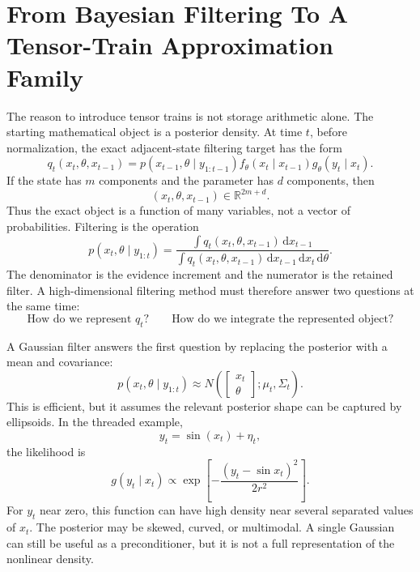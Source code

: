 \documentclass[11pt]{article}
\numberwithin{equation}{section}
\newcommand{\R}{\mathbb R}
\newcommand{\dd}{\,\mathrm d}
\begin{document}
\section{From Bayesian Filtering To A Tensor-Train Approximation Family}

The reason to introduce tensor trains is not storage arithmetic alone.  The
starting mathematical object is a posterior density.  At time \(t\), before
normalization, the exact adjacent-state filtering target has the form
\begin{equation}
    q_t(x_t,\theta,x_{t-1})
    =
    p(x_{t-1},\theta\mid y_{1:t-1})
    f_\theta(x_t\mid x_{t-1})
    g_\theta(y_t\mid x_t).
    \label{eq:p25-bridge-1}
\end{equation}
If the state has \(m\) components and the parameter has \(d\) components, then
\begin{equation}
    (x_t,\theta,x_{t-1})\in\R^{2m+d}.
    \label{eq:p25-bridge-2}
\end{equation}
Thus the exact object is a function of many variables, not a vector of
probabilities.  Filtering is the operation
\begin{equation}
    p(x_t,\theta\mid y_{1:t})
    =
    \frac{\int q_t(x_t,\theta,x_{t-1})\dd x_{t-1}}
    {\int q_t(x_t,\theta,x_{t-1})\dd x_{t-1}\dd x_t\dd\theta}.
    \label{eq:p25-bridge-3}
\end{equation}
The denominator is the evidence increment and the numerator is the retained
filter.  A high-dimensional filtering method must therefore answer two
questions at the same time:
\begin{equation}
    \text{How do we represent }q_t?
    \qquad
    \text{How do we integrate the represented object?}
    \label{eq:p25-bridge-4}
\end{equation}

A Gaussian filter answers the first question by replacing the posterior with a
mean and covariance:
\begin{equation}
    p(x_t,\theta\mid y_{1:t})
    \approx
    N\!\left(
    \begin{bmatrix}x_t\\\theta\end{bmatrix};
    \mu_t,\Sigma_t
    \right).
    \label{eq:p25-bridge-5}
\end{equation}
This is efficient, but it assumes the relevant posterior shape can be captured
by ellipsoids.  In the threaded example,
\begin{equation}
    y_t=\sin(x_t)+\eta_t,
    \label{eq:p25-bridge-6}
\end{equation}
the likelihood is
\begin{equation}
    g(y_t\mid x_t)
    \propto
    \exp\!\left[
    -\frac{(y_t-\sin x_t)^2}{2r^2}
    \right].
    \label{eq:p25-bridge-7}
\end{equation}
For \(y_t\) near zero, this function can have high density near several
separated values of \(x_t\).  The posterior may be skewed, curved, or
multimodal.  A single Gaussian can still be useful as a preconditioner, but it
is not a full representation of the nonlinear density.
\end{document}
